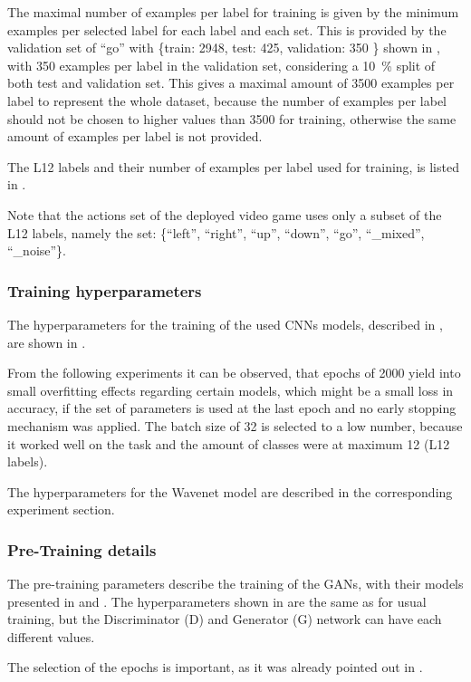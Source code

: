 The maximal number of examples per label for training is given by the minimum examples per selected label for each label and each set.
This is provided by the validation set of \enquote{go} with \{train: 2948, test: 425, validation: 350 \} shown in , with 350 examples per label in the validation set, considering a \SI{10}{\percent} split of both test and validation set.
This gives a maximal amount of 3500 examples per label to represent the whole dataset, because the number of examples per label should not be chosen to higher values than 3500 for training, otherwise the same amount of examples per label is not provided.

The L12 labels and their number of examples per label used for training, is listed in .

Note that the actions set of the deployed video game uses only a subset of the L12 labels, namely the set: \{\enquote{left},  \enquote{right}, \enquote{up}, \enquote{down}, \enquote{go}, \enquote{\_mixed}, \enquote{\_noise}\}.



\subsubsection{Training hyperparameters}
The hyperparameters for the training of the used CNNs models, described in , are shown in .

From the following experiments it can be observed, that epochs of 2000 yield into small overfitting effects regarding certain models, which might be a small loss in accuracy, if the set of parameters is used at the last epoch and no early stopping mechanism was applied.
The batch size of 32 is selected to a low number, because it worked well on the task and the amount of classes were at maximum 12 (L12 labels).

The hyperparameters for the Wavenet model are described in the corresponding experiment section.



\subsubsection{Pre-Training details}
The pre-training parameters describe the training of the GANs, with their models presented in  and .
The hyperparameters shown in  are the same as for usual training, but the Discriminator (D) and Generator (G) network can have each different values.

The selection of the epochs is important, as it was already pointed out in .


